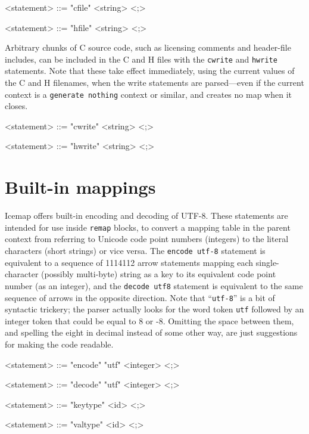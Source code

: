 \documentclass{mitsuba}
\begin{document}
\begin{grammar}
<statement> ::= "cfile" <string> <;>

<statement> ::= "hfile" <string> <;>
\end{grammar}

Arbitrary chunks of C source code, such as licensing comments and
header-file includes, can be included in the C and H files with the
\texttt{cwrite} and \texttt{hwrite} statements.  Note that these take effect
immediately, using the current values of the C and H filenames, when the
write statements are parsed---even if the current context is a
\texttt{generate nothing} context or similar, and creates no map when it
closes.

\begin{grammar}
<statement> ::= "cwrite" <string> <;>

<statement> ::= "hwrite" <string> <;>
\end{grammar}

\section{Built-in mappings}

Icemap offers built-in encoding and decoding of UTF-8.  These statements are
intended for use inside \texttt{remap} blocks, to convert a mapping table in
the parent context from referring to Unicode code point numbers (integers)
to the literal characters (short strings) or vice versa.  The \texttt{encode
utf-8} statement is equivalent to a sequence of 1114112 arrow statements
mapping each single-character (possibly multi-byte) string as a key to its
equivalent code point number (as an integer), and the \texttt{decode utf8}
statement is equivalent to the same sequence of arrows in the opposite
direction.  Note that ``\texttt{utf-8}'' is a bit of syntactic trickery; the
parser actually looks for the word token \texttt{utf} followed by an integer
token that could be equal to 8 or -8.  Omitting the space between them, and
spelling the eight in decimal instead of some other way, are just
suggestions for making the code readable.

\begin{grammar}
<statement> ::= "encode" "utf" <integer> <;>

<statement> ::= "decode" "utf" <integer> <;>
\end{grammar}

\begin{grammar}
<statement> ::= "keytype" <id> <;>

<statement> ::= "valtype" <id> <;>
\end{grammar}
\end{document}

